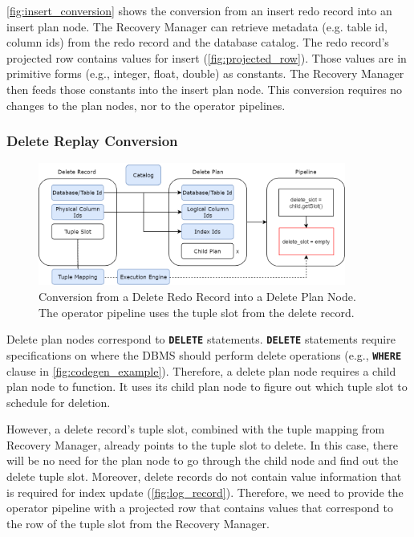 \documentclass[12pt]{cmuthesis}
\newcommand{\dbSQL}[1]{\texttt{\textbf{#1}}\xspace}
\begin{document}
\cref{fig:insert_conversion} shows the conversion from an insert redo record into an insert plan node. The Recovery Manager can retrieve metadata (e.g. table id, column ids) from the redo record and the database catalog. The redo record's projected row contains values for insert (\cref{fig:projected_row}). Those values are in primitive forms (e.g., integer, float, double) as constants. The Recovery Manager then feeds those constants into the insert plan node. This conversion requires no changes to the plan nodes, nor to the operator pipelines.

\subsubsection{Delete Replay Conversion}
\label{delete_replay_conversion}

\begin{figure}[t!]
\centering
\includegraphics[width=0.9\textwidth]{images/DeleteConversion.png}
\caption{Conversion from a Delete Redo Record into a Delete Plan Node. The operator pipeline uses the tuple slot from the delete record.}
\label{fig:delete_conversion}
\end{figure}

Delete plan nodes correspond to \dbSQL{DELETE} statements. \dbSQL{DELETE} statements require specifications on where the DBMS should perform delete operations (e.g., \dbSQL{WHERE} clause in \cref{fig:codegen_example}). Therefore, a delete plan node requires a child plan node to function. It uses its child plan node to figure out which tuple slot to schedule for deletion.

However, a delete record's tuple slot, combined with the tuple mapping from Recovery Manager, already points to the tuple slot to delete. In this case, there will be no need for the plan node to go through the child node and find out the delete tuple slot. Moreover, delete records do not contain value information that is required for index update (\cref{fig:log_record}). Therefore, we need to provide the operator pipeline with a projected row that contains values that correspond to the row of the tuple slot from the Recovery Manager.
\end{document}
